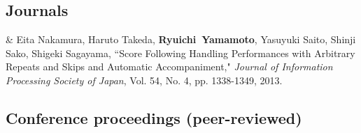 \documentclass[11pt, a4paper]{article}
\newcommand{\FirstName}{Ryuichi}
\newcommand{\LastName}{Yamamoto}
\newcommand{\MyName}{\FirstName\ \LastName}
\newcommand{\Year}[1]{\fontsize{10pt}{0}\selectfont #1}
\begin{document}
\subsection{Journals}

\begin{EntriesTable}
\Year{2013}  &
  Eita Nakamura, Haruto Takeda, \textbf{\MyName}, Yasuyuki Saito, Shinji Sako, Shigeki Sagayama,
  ``Score Following Handling Performances with Arbitrary Repeats and Skips and Automatic Accompaniment,"
  \emph{Journal of Information Processing Society of Japan}, Vol. 54, No. 4, pp. 1338-1349, 2013.
\end{EntriesTable}


\subsection{Conference proceedings (peer-reviewed)}
\end{document}
